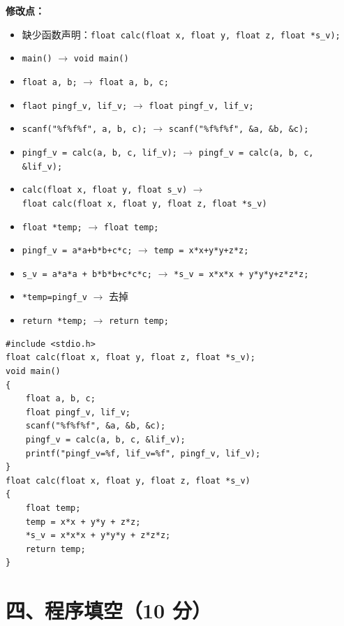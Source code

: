 \documentclass[UTF8,a4paper,10.5pt]{ctexart}
\begin{document}
\noindent\textbf{修改点：}
\begin{itemize}[leftmargin=2em, itemsep=1pt, topsep=2pt]
    \item 缺少函数声明：\texttt{float calc(float x, float y, float z, float *s\_v);}
    \item \texttt{main()} $\longrightarrow$ \texttt{void main()}
    \item \texttt{float a, b;} $\longrightarrow$ \texttt{float a, b, c;}
    \item \texttt{flaot pingf\_v, lif\_v;} $\longrightarrow$ \texttt{float pingf\_v, lif\_v;}
    \item \texttt{scanf("\%f\%f\%f", a, b, c);} $\longrightarrow$ \texttt{scanf("\%f\%f\%f", \&a, \&b, \&c);}
    \item \texttt{pingf\_v = calc(a, b, c, lif\_v);} $\longrightarrow$ \texttt{pingf\_v = calc(a, b, c, \&lif\_v);}
    \item \texttt{calc(float x, float y, float s\_v)} $\longrightarrow$ \\
          \texttt{float calc(float x, float y, float z, float *s\_v)}
    \item \texttt{float *temp;} $\longrightarrow$ \texttt{float temp;}
    \item \texttt{pingf\_v = a*a+b*b+c*c;} $\longrightarrow$ \texttt{temp = x*x+y*y+z*z;}
    \item \texttt{s\_v = a*a*a + b*b*b+c*c*c;} $\longrightarrow$ \texttt{*s\_v = x*x*x + y*y*y+z*z*z;}
    \item \texttt{*temp=pingf\_v} $\longrightarrow$ 去掉
    \item \texttt{return *temp;} $\longrightarrow$ \texttt{return temp;}
\end{itemize}
\begin{lstlisting}
#include <stdio.h>
float calc(float x, float y, float z, float *s_v);
void main()
{
    float a, b, c;
    float pingf_v, lif_v;
    scanf("%f%f%f", &a, &b, &c);
    pingf_v = calc(a, b, c, &lif_v);
    printf("pingf_v=%f, lif_v=%f", pingf_v, lif_v);
}
float calc(float x, float y, float z, float *s_v)
{
    float temp;
    temp = x*x + y*y + z*z;
    *s_v = x*x*x + y*y*y + z*z*z;
    return temp;
}
\end{lstlisting}

\section*{四、程序填空（10 分）}
\end{document}
